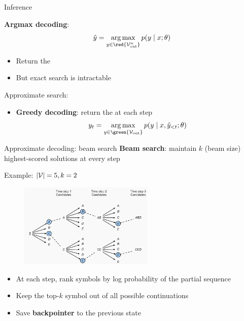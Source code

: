 \documentclass[usenames,dvipsnames,notes,11pt,aspectratio=169,hyperref={colorlinks=true, linkcolor=blue}]{beamer}
\begin{document}
\begin{frame}
    {Inference}

    \textbf{Argmax decoding}: 
    $$
    \hat{y} = \argmax_{y\in\red{\sV_{\text{out}}^n}} p(y\mid x; \theta)
    $$
    \vspace{-1em}
    \begin{itemize}
        \item Return the 
        \item But exact search is intractable 
    \end{itemize}

    \pause
    Approximate search:\\
    \begin{itemize}
        \item \textbf{Greedy decoding}: return the  at each step
            $$
            y_t = \argmax_{y\in\green{\sV_{\text{out}}}} p(y\mid x, \hat{y}_{<t}; \theta)
            $$
    \end{itemize}
\end{frame}

\begin{frame}
    {Approximate decoding: beam search}
    \textbf{Beam search}: maintain $k$ (beam size) highest-scored  solutions at every step 
    
    Example: $|\mathcal{V}|=5, k=2$
    \vspace{-1em}
    \begin{figure}
        \includegraphics[height=4cm]{figures/beam-search}
    \end{figure}
    \vspace{-1em}

    \begin{itemize}
        \item At each step, rank symbols by log probability of the partial sequence
        \item Keep the top-$k$ symbol out of all possible continuations
        \item Save \textbf{backpointer} to the previous state
    \end{itemize}
\end{frame}
\end{document}
